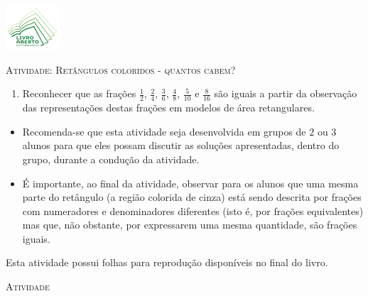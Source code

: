 \documentclass[10 pt,usenames,dvipsnames, oneside]{article}
\begin{document}
\begin{center}
  \begin{minipage}[l]{3cm}
\includegraphics[width=2cm]{../../../Figuras/logo}       
\end{minipage}\hfill
\begin{minipage}[r]{.8\textwidth}
 {\Large \scshape Atividade: Retângulos coloridos - quantos cabem?}  
\end{minipage}
\end{center}
\vspace{.2cm}

\ifdefined\prof
\begin{goals}
\begin{enumerate}
\item       Reconhecer que as frações       $\frac{1}{2}$,
$\frac{2}{4}$,       $\frac{3}{6}$,       $\frac{4}{8}$,       $\frac{5}{10}$
e       $\frac{8}{16}$       são iguais a partir da observação das
representações destas frações em modelos de área retangulares.
\end{enumerate}

\tcblower

\begin{itemize}
\item       Recomenda-se que esta atividade seja desenvolvida em grupos de
$2$       ou       $3$       alunos para que eles possam discutir as
soluções apresentadas, dentro do grupo, durante a condução da atividade.
\item       É importante, ao final da atividade, observar para os alunos que
uma mesma parte do retângulo (a região colorida de cinza) está sendo descrita
por frações com numeradores e denominadores diferentes (isto é, por frações
equivalentes) mas que, não obstante, por expressarem uma mesma quantidade, são
frações iguais.
\end{itemize}

Esta atividade possui     folhas para reprodução disponíveis no final do
livro.
\end{goals}

\bigskip
\begin{center}
{\large \scshape Atividade}
\end{center}
\fi
\end{document}

